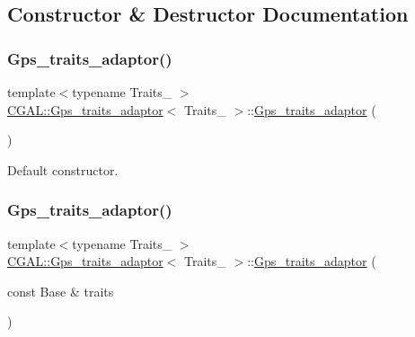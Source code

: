\subsection{Constructor \& Destructor Documentation}
\mbox{\label{class_c_g_a_l_1_1_gps__traits__adaptor_a85a737a0ea42b18c1e7436000922d394}} 
\subsubsection{\texorpdfstring{Gps\_traits\_adaptor()}{Gps\_traits\_adaptor()}\hspace{0.1cm}{\footnotesize\ttfamily [1/2]}}
{\footnotesize\ttfamily template$<$typename Traits\+\_\+ $>$ \\
\mbox{\hyperlink{class_c_g_a_l_1_1_gps__traits__adaptor}{C\+G\+A\+L\+::\+Gps\+\_\+traits\+\_\+adaptor}}$<$ Traits\+\_\+ $>$\+::\mbox{\hyperlink{class_c_g_a_l_1_1_gps__traits__adaptor}{Gps\+\_\+traits\+\_\+adaptor}} (\begin{DoxyParamCaption}{ }\end{DoxyParamCaption})\hspace{0.3cm}{\ttfamily [inline]}}



Default constructor. 

\mbox{\label{class_c_g_a_l_1_1_gps__traits__adaptor_a545dbb2f232dcc9c77f0d7a44545fc5e}} 
\subsubsection{\texorpdfstring{Gps\_traits\_adaptor()}{Gps\_traits\_adaptor()}\hspace{0.1cm}{\footnotesize\ttfamily [2/2]}}
{\footnotesize\ttfamily template$<$typename Traits\+\_\+ $>$ \\
\mbox{\hyperlink{class_c_g_a_l_1_1_gps__traits__adaptor}{C\+G\+A\+L\+::\+Gps\+\_\+traits\+\_\+adaptor}}$<$ Traits\+\_\+ $>$\+::\mbox{\hyperlink{class_c_g_a_l_1_1_gps__traits__adaptor}{Gps\+\_\+traits\+\_\+adaptor}} (\begin{DoxyParamCaption}\item[{const Base \&}]{traits }\end{DoxyParamCaption})\hspace{0.3cm}{\ttfamily [inline]}}



